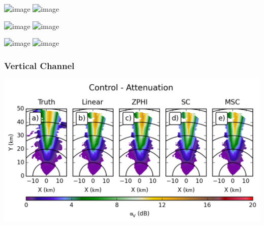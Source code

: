 \documentclass[red]{beamer}
\begin{document}
\begin{frame}
    \begin{center}
        \includegraphics<1>[scale=0.7]{figures/spatial/X_RadialWidth_Differential_Attenuation}
        \includegraphics<2>[scale=0.7]{figures/spatial/X_Control_Differential_Attenuation}
    \end{center}
\end{frame}

\begin{frame}
    \begin{center}
        \includegraphics<1>[scale=0.7]{figures/spatial/X_RadialWidth_Differential_Attenuation_Difference}
        \includegraphics<2>[scale=0.7]{figures/spatial/X_Control_Differential_Attenuation_Difference}
    \end{center}
\end{frame}

\begin{frame}
    \begin{center}
        \includegraphics<1>[scale=0.7]{figures/spatial/X_RadialWidth_Specific_Differential_Attenuation_scatter}
        \includegraphics<2>[scale=0.7]{figures/spatial/X_Control_Specific_Differential_Attenuation_scatter}
    \end{center}
\end{frame}

\subsubsection{Vertical Channel}
\begin{frame}
    \begin{center}
        \includegraphics[scale=0.7]{figures/spatial/C_Control_Attenuation_V}
    \end{center}
\end{frame}
\end{document}
